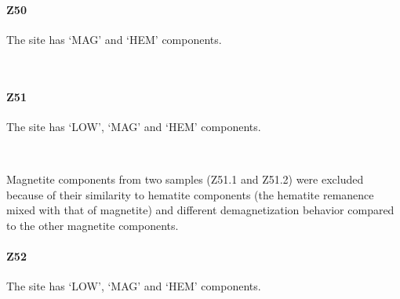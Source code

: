 \documentclass[11pt]{article}
\begin{document}
    \newpage
    
    \paragraph{Z50}\label{z50}

    The site has `MAG' and `HEM' components.



    \begin{center}
    \end{center}
    { \hspace*{\fill} \\}
    
    \newpage
    
    \paragraph{Z51}\label{z51}

    The site has `LOW', `MAG' and `HEM' components.



    \begin{center}
    \end{center}
    { \hspace*{\fill} \\}
    
    Magnetite components from two samples (Z51.1 and Z51.2) were excluded
because of their similarity to hematite components (the hematite
remanence mixed with that of magnetite) and different demagnetization
behavior compared to the other magnetite components.

\newpage

    \paragraph{Z52}\label{z52}

    The site has `LOW', `MAG' and `HEM' components.



    \begin{center}
    \end{center}
    { \hspace*{\fill} \\}
    
\end{document}
